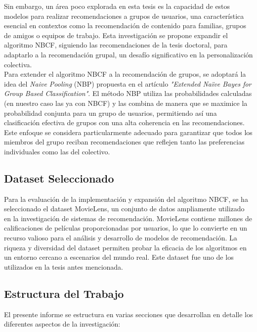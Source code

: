 \documentclass[twocolumn, fontsize=10pt]{article}
\begin{document}
Sin embargo, un área poco explorada en esta tesis es 
la capacidad de estos modelos para realizar 
recomendaciones a grupos de usuarios, una 
característica esencial en contextos como la 
recomendación de contenido para familias, grupos de 
amigos o equipos de trabajo. Esta investigación se 
propone expandir el algoritmo NBCF, siguiendo las 
recomendaciones de la tesis doctoral, para adaptarlo 
a la recomendación grupal, un desafío significativo 
en la personalización colectiva.\\

Para extender el algoritmo NBCF a la recomendación de 
grupos, se adoptará la idea del \textit{Naive Pooling} (NBP) 
propuesta en el artículo \textit{"Extended Naïve Bayes for 
Group Based Classification"}\cite{nbp}. El método NBP utiliza 
las probabilidades calculadas (en nuestro caso las ya 
con NBCF) y las 
combina de manera que se maximice la probabilidad 
conjunta para un grupo de usuarios, permitiendo así 
una clasificación efectiva de grupos con una alta 
coherencia en las recomendaciones. Este enfoque se 
considera particularmente adecuado para garantizar 
que todos los miembros del grupo reciban 
recomendaciones que reflejen tanto las preferencias 
individuales como las del colectivo.

\subsection{Dataset Seleccionado}

Para la evaluación de la implementación y expansión 
del algoritmo NBCF, se ha seleccionado el dataset 
MovieLens\cite{movielens}, un conjunto de datos ampliamente utilizado 
en la investigación de sistemas de recomendación. 
MovieLens contiene millones de calificaciones de 
películas proporcionadas por usuarios, lo que lo 
convierte en un recurso valioso para el análisis y 
desarrollo de modelos de recomendación. 
La riqueza y diversidad del dataset permiten probar 
la eficacia de los algoritmos en un entorno 
cercano a escenarios del mundo real. 
Este dataset fue uno de los utilizados en la tesis antes mencionada.

\subsection{Estructura del Trabajo}

El presente informe se estructura en varias secciones 
que desarrollan en detalle los diferentes aspectos de 
la investigación:
\end{document}
